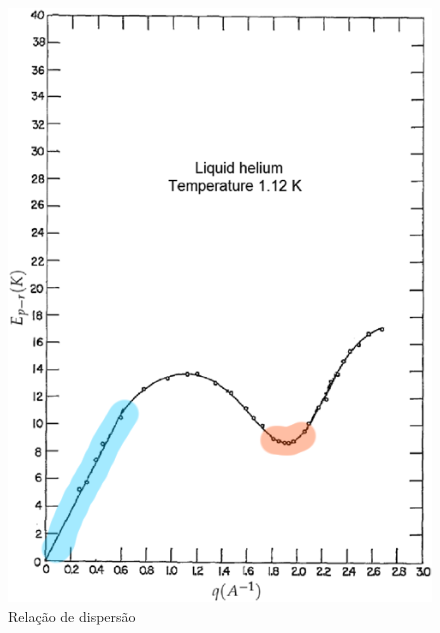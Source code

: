 \documentclass[]{IMTexam}
\begin{document}
\begin{questions}
\begin{parts}
\begin{solution}
\begin{multi}
				\nextcol

				\begin{figure}[H]
					\centering
					\includegraphics[width=0.6\linewidth]{diagram3}
					\caption{Relação de dispersão}
					\label{fig:fig3}
				\end{figure}
			\end{multi}
		\end{solution}

	\end{parts}

\end{questions}
\end{document}
